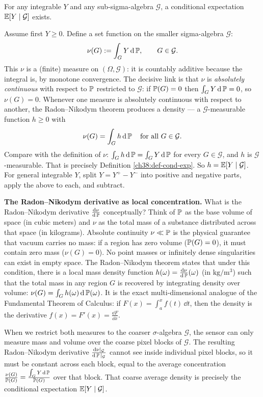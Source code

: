 \begin{theorem}
\label{ch38:thm-existence}
For any integrable $Y$ and any sub-sigma-algebra $\mathcal{G}$, a conditional expectation
$\E[Y\given\mathcal{G}]$ exists.
\end{theorem}

\begin{whybox}
Assume first $Y \ge 0$. Define a set function on the smaller sigma-algebra $\mathcal{G}$:
\[
  \nu(G) := \int_G Y \,\dd\P, \qquad G \in \mathcal{G}.
\]
This $\nu$ is a (finite) measure on $(\Omega, \mathcal{G})$: it is countably additive because the
integral is, by monotone convergence. The decisive link is that $\nu$ is \emph{absolutely continuous} with respect
to $\P$ restricted to $\mathcal{G}$: if $\P(G) = 0$ then $\int_G Y\,\dd\P = 0$, so $\nu(G) = 0$.
Whenever one measure is absolutely continuous with respect to another, the Radon--Nikodym theorem
produces a density --- a $\mathcal{G}$-measurable function $h \ge 0$ with
\[
  \nu(G) = \int_G h \,\dd\P \quad\text{for all } G \in \mathcal{G}.
\]
Compare with the definition of $\nu$: $\int_G h\,\dd\P = \int_G Y\,\dd\P$ for every $G \in
\mathcal{G}$, and $h$ is $\mathcal{G}$-measurable. That is precisely Definition
\ref{ch38:def-cond-exp}. So $h = \E[Y\given\mathcal{G}]$. For general integrable $Y$, split $Y = Y^+
- Y^-$ into positive and negative parts, apply the above to each, and subtract.
\end{whybox}

\begin{intuitionbox}
\textbf{The Radon--Nikodym derivative as local concentration.} What is the Radon--Nikodym derivative $\frac{\dd\nu}{\dd\P}$ conceptually? Think of $\P$ as the base volume of space (in cubic meters) and $\nu$ as the total mass of a substance distributed across that space (in kilograms). Absolute continuity $\nu \ll \P$ is the physical guarantee that vacuum carries no mass: if a region has zero volume ($\P(G) = 0$), it must contain zero mass ($\nu(G) = 0$). No point masses or infinitely dense singularities can exist in empty space. The Radon--Nikodym theorem states that under this condition, there is a local mass density function $h(\omega) = \frac{\dd\nu}{\dd\P}(\omega)$ (in $\text{kg}/\text{m}^3$) such that the total mass in any region $G$ is recovered by integrating density over volume: $\nu(G) = \int_G h(\omega)\,\dd\P(\omega)$. It is the exact multi-dimensional analogue of the Fundamental Theorem of Calculus: if $F(x) = \int_a^x f(t)\,\dd t$, then the density is the derivative $f(x) = F'(x) = \frac{\dd F}{\dd x}$.

When we restrict both measures to the coarser $\sigma$-algebra $\mathcal{G}$, the sensor can only measure mass and volume over the coarse pixel blocks of $\mathcal{G}$. The resulting Radon--Nikodym derivative $\frac{\dd\nu|_\mathcal{G}}{\dd\P|_\mathcal{G}}$ cannot see inside individual pixel blocks, so it must be constant across each block, equal to the average concentration $\frac{\nu(G)}{\P(G)} = \frac{\int_G Y\,\dd\P}{\P(G)}$ over that block. That coarse average density is precisely the conditional expectation $\E[Y\given\mathcal{G}]$.
\end{intuitionbox}

